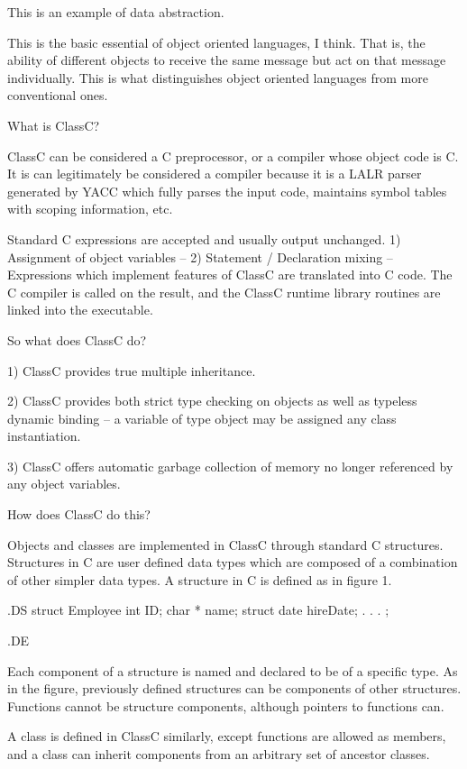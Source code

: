 This is an example of data abstraction.

This is the basic essential of object oriented languages, I think.
That is, the ability of different objects to receive the same message
but act on that message individually.  This is what distinguishes 
object oriented languages from more conventional ones.

What is ClassC?

ClassC can be considered a C preprocessor, or a compiler whose object code
is C.  It is can legitimately be considered a compiler because it
is a LALR parser generated by YACC which fully parses the input code,
maintains symbol tables with scoping information, etc.  

Standard C expressions are accepted and usually output unchanged.
	1) Assignment of object variables --
	2) Statement / Declaration mixing --
Expressions which implement features of ClassC are translated into 
C code.  The C compiler is called on the result, and the ClassC runtime
library routines are linked into the executable.  

So what does ClassC do?


  1) ClassC provides true multiple inheritance.

  2) ClassC provides both strict type checking on objects
as well as typeless dynamic binding -- a variable of type
\fI object \fP may be assigned any class instantiation.

  3) ClassC offers automatic garbage collection of memory no longer
referenced by any object variables.

How does ClassC do this?


Objects and classes are implemented in ClassC through standard C structures.
Structures in C are user defined data types which are composed of
a combination of other simpler data types.
A structure in C is defined as in figure 1.

.DS
struct Employee
    {	int	ID;
	char *	name;
	struct date hireDate;
		.
		.
		.
    }	;

.DE

Each component of a structure is named and declared to be of a specific
type.  As in the figure, previously defined structures can be components of
other structures.  Functions cannot be structure components, although
pointers to functions can.

A class is defined in ClassC similarly, except functions are allowed as
members, and a class can inherit components from an arbitrary set of
ancestor classes.

